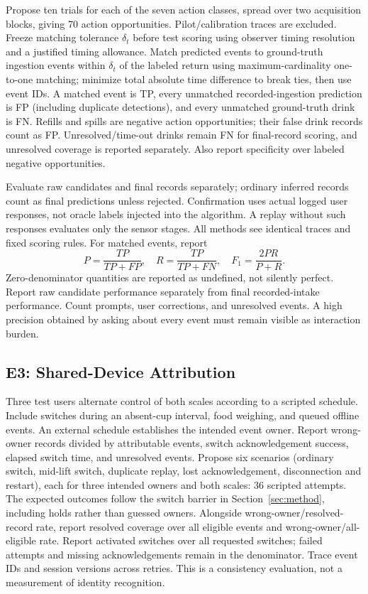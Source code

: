 \documentclass[conference]{IEEEtran}
\providecommand{\DIFadd}[1]{{\protect\color{blue} \sf #1}} %
\providecommand{\DIFaddbegin}{} %
\providecommand{\DIFaddend}{} %
\begin{document}
\DIFaddbegin \DIFadd{Propose ten trials for each of the seven action classes, spread over two acquisition blocks, giving 70 action opportunities. Pilot/calibration traces are excluded. Freeze matching tolerance $\delta_t$ before test scoring using observer timing resolution and a justified timing allowance. Match predicted events to ground-truth ingestion events within $\delta_t$ of the labeled return using maximum-cardinality one-to-one matching; minimize total absolute time difference to break ties, then use event IDs. A matched event is TP, every unmatched recorded-ingestion prediction is FP (including duplicate detections), and every unmatched ground-truth drink is FN. Refills and spills are negative action opportunities; their false drink records count as FP. Unresolved/time-out drinks remain FN for final-record scoring, and unresolved coverage is reported separately. Also report specificity over labeled negative opportunities.
}

\DIFadd{Evaluate raw candidates and final records separately; ordinary inferred records count as final predictions unless rejected. Confirmation uses actual logged user responses, not oracle labels injected into the algorithm. A replay without such responses evaluates only the sensor stages. All methods see identical traces and fixed scoring rules. }\DIFaddend For matched events, report
\begin{equation}P=\frac{TP}{TP+FP},\quad R=\frac{TP}{TP+FN},\quad
F_1=\frac{2PR}{P+R}.\label{eq:detection}\end{equation}
Zero-denominator quantities are reported as undefined, not silently perfect. Report raw candidate performance separately from final recorded-intake performance. Count prompts, user corrections, and unresolved events. A high precision obtained by asking about every event must remain visible as interaction burden.

\subsection{E3: Shared-Device Attribution}
Three test users alternate control of both scales according to a scripted schedule. Include switches during an absent-cup interval, food weighing, and queued offline events. An external schedule establishes the intended event owner. Report wrong-owner records divided by attributable events, switch acknowledgement success, elapsed switch time, and unresolved events. \DIFaddbegin \DIFadd{Propose six scenarios (ordinary switch, mid-lift switch, duplicate replay, lost acknowledgement, disconnection and restart), each for three intended owners and both scales: 36 scripted attempts. The expected outcomes follow the switch barrier in Section~\ref{sec:method}, including holds rather than guessed owners. Alongside wrong-owner/resolved-record rate, report resolved coverage over all eligible events and wrong-owner/all-eligible rate. Report activated switches over all requested switches; failed attempts and missing acknowledgements remain in the denominator. }\DIFaddend Trace event IDs and session versions across retries. This is a consistency evaluation, not a measurement of identity recognition.
\end{document}
